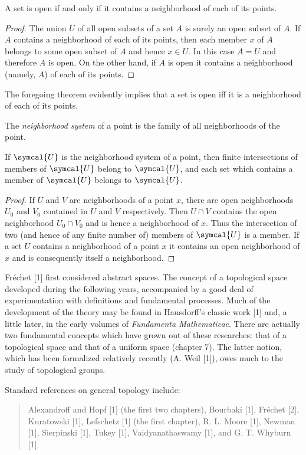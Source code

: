 \begin{theorem}
    A set is open if and only if it contains a neighborhood of each of its points.
\end{theorem}

\begin{proof}
    The union \(U\) of all open subsets of a set \(A\) is surely an open subset of \(A\). If \(A\) contains a neighborhood of each of its points, then each member \(x\) of \(A\) belongs to some open subset of \(A\) and hence \(x\in U\). In this case \(A=U\) and therefore \(A\) is open. On the other hand, if \(A\) is open it contains a neighborhood (namely, \(A\)) of each of its points.
\end{proof}

The foregoing theorem evidently implies that a set is open iff it is a neighborhood of each of its points.

The \emph{neighborhood system} of a point is the family of all neighborhoods of the point.

\begin{theorem}
    If \(\symcal{U}\) is the neighborhood system of a point, then finite intersections of members of \(\symcal{U}\) belong to \(\symcal{U}\), and each set which contains a member of \(\symcal{U}\) belongs to \(\symcal{U}\).
\end{theorem}

\begin{proof}
    If \(U\) and \(V\) are neighborhoods of a point \(x\), there are open neighborhoods \(U_0\) and \(V_0\) contained in \(U\) and \(V\) respectively. Then \(U\cap V\) contains the open neighborhood \(U_0\cap V_0\) and is hence a neighborhood of \(x\). Thus the intersection of two (and hence of any finite number of) members of \(\symcal{U}\) is a member. If a set \(U\) contains a neighborhood of a point \(x\) it contains an open neighborhood of \(x\) and is consequently itself a neighborhood.
\end{proof}

\begin{notes}
    Fréchet [1] first considered abstract spaces. The concept of a topological space developed during the following years, accompanied by a good deal of experimentation with definitions and fundamental processes. Much of the development of the theory may be found in Hausdorff's classic work [1] and, a little later, in the early volumes of \emph{Fundamenta Mathematicae}. There are actually two fundamental concepts which have grown out of these researches: that of a topological space and that of a uniform space (chapter 7). The latter notion, which has been formalized relatively recently (A. Weil [1]), owes much to the study of topological groups.
    
    Standard references on general topology include:
    \begin{quote}
        Alexandroff and Hopf [1] (the first two chapters), Bourbaki [1], Fréchet [2], Kuratowski [1], Lefschetz [1] (the first chapter), R. L. Moore [1], Newman [1], Sierpinski [1], Tukey [1], Vaidyanathaswamy [1], and G. T. Whyburn [1].
    \end{quote}
\end{notes}
